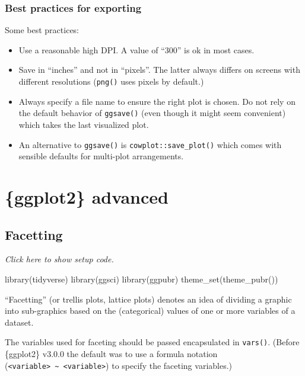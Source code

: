 \documentclass[]{book}
\newenvironment{Shaded}{}{}
\newcommand{\KeywordTok}[1]{\textcolor[rgb]{0.00,0.00,1.00}{#1}}
\newcommand{\NormalTok}[1]{#1}
\begin{document}
\hypertarget{best-practices-for-exporting}{%
\subsection{Best practices for exporting}\label{best-practices-for-exporting}}

Some best practices:

\begin{itemize}
\item
  Use a reasonable high DPI. A value of ``300'' is ok in most cases.
\item
  Save in ``inches'' and not in ``pixels''. The latter always differs on screens with different resolutions (\texttt{png()} uses pixels by default.)
\item
  Always specify a file name to ensure the right plot is chosen. Do not rely on the default behavior of \texttt{ggsave()} (even though it might seem convenient) which takes the last visualized plot.
\item
  An alternative to \texttt{ggsave()} is \texttt{cowplot::save\_plot()} which comes with sensible defaults for multi-plot arrangements.
\end{itemize}

\hypertarget{vis-adv}{%
\chapter{\{ggplot2\} advanced}\label{vis-adv}}

\hypertarget{facetting}{%
\section{Facetting}\label{facetting}}

\emph{Click here to show setup code.}

\begin{Shaded}
\begin{Highlighting}[]
\KeywordTok{library}\NormalTok{(tidyverse)}
\KeywordTok{library}\NormalTok{(ggsci)}
\KeywordTok{library}\NormalTok{(ggpubr)}
\KeywordTok{theme_set}\NormalTok{(}\KeywordTok{theme_pubr}\NormalTok{())}
\end{Highlighting}
\end{Shaded}

``Facetting'' (or trellis plots, lattice plots) denotes an idea of dividing a graphic into sub-graphics based on the (categorical) values of one or more variables of a dataset.

The variables used for faceting should be passed encapsulated in \texttt{vars()}.
(Before \{ggplot2\} v3.0.0 the default was to use a formula notation (\texttt{\textless{}variable\textgreater{}\ \textasciitilde{}\ \textless{}variable\textgreater{}}) to specify the faceting variables.)
\end{document}
